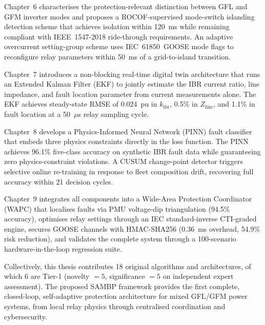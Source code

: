 \begin{doublespacing}
Chapter~6 characterises the protection-relevant distinction between GFL and
GFM inverter modes and proposes a ROCOF-supervised mode-switch islanding
detection scheme that achieves isolation within 120~ms while remaining
compliant with IEEE~1547-2018 ride-through requirements. An adaptive
overcurrent setting-group scheme uses IEC~61850~GOOSE mode flags to
reconfigure relay parameters within 50~ms of a grid-to-island transition.

Chapter~7 introduces a non-blocking real-time digital twin architecture
that runs an Extended Kalman Filter (EKF) to jointly estimate the IBR
current ratio, line impedance, and fault location parameter from current
measurements alone. The EKF achieves steady-state RMSE of 0.024~pu in
$k_\mathrm{ibr}$, 0.5\% in $Z_\mathrm{line}$, and 1.1\% in fault location
at a 50~$\mu$s relay sampling cycle.

Chapter~8 develops a Physics-Informed Neural Network (PINN) fault classifier
that embeds three physics constraints directly in the loss function.
The PINN achieves 96.1\% five-class accuracy on synthetic IBR fault data
while guaranteeing zero physics-constraint violations. A CUSUM change-point
detector triggers selective online re-training in response to fleet
composition drift, recovering full accuracy within 21 decision cycles.

Chapter~9 integrates all components into a Wide-Area Protection Coordinator
(WAPC) that localises faults via PMU voltage-dip triangulation (94.5\%
accuracy), optimises relay settings through an IEC standard-inverse
CTI-graded engine, secures GOOSE channels with HMAC-SHA256 (0.36~ms overhead,
54.9\% risk reduction), and validates the complete system through a
100-scenario hardware-in-the-loop regression suite.

Collectively, this thesis contributes 18 original algorithms and architectures,
of which 6 are Tier-1 (novelty $= 5$, significance $= 5$ on independent
expert assessment). The proposed SAMBP framework provides the first complete,
closed-loop, self-adaptive protection architecture for mixed GFL/GFM power
systems, from local relay physics through centralised coordination and
cybersecurity.

\end{doublespacing}
